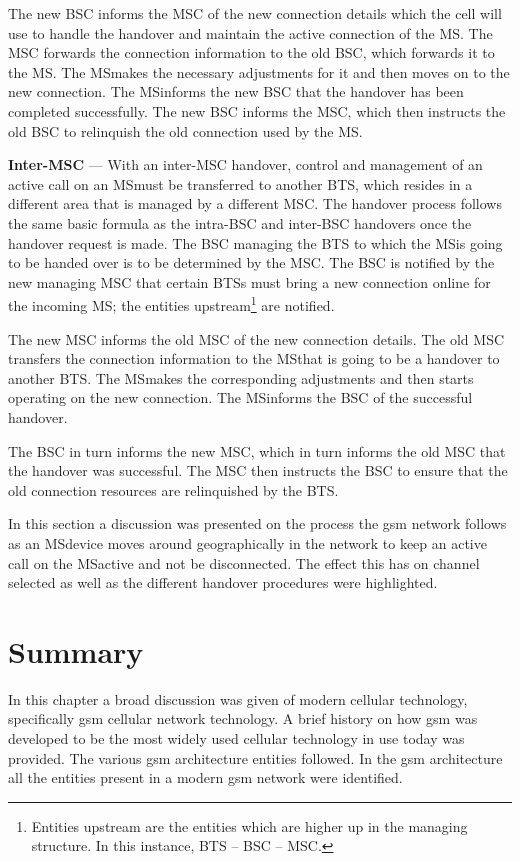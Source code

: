 \begin{description}
The new BSC informs the MSC of the new connection details which the cell will use to handle the handover and maintain the active connection of the MS\@. The MSC forwards the connection information to the old BSC, which forwards it to the MS\@. The \gls{MS}makes the necessary adjustments for it and then moves on to the new connection. The \gls{MS}informs the new BSC that the handover has been completed successfully. The new BSC informs the MSC, which then instructs the old BSC to relinquish the old connection used by the MS\cite{wirelesstelcoMullet,GSMArchitectureProtocolsServices}.
\item{\textbf{Inter-MSC}} --- With an inter-MSC handover, control and management of an active call on an \gls{MS}must be transferred to another BTS, which resides in a different area that is managed by a different MSC\@. The handover process follows the same basic formula as the intra-BSC and inter-BSC handovers once the handover request is made\cite{wirelesstelcoMullet,GSMArchitectureProtocolsServices}.
The BSC managing the BTS to which the \gls{MS}is going to be handed over is to be determined by the MSC\@. The BSC is notified by the new managing MSC that certain BTSs must bring a new connection online for the incoming MS; the entities upstream\footnote{Entities upstream are the entities which are higher up in the managing structure. In this instance, BTS -- BSC -- MSC\@.} are notified\cite{wirelesstelcoMullet,GSMArchitectureProtocolsServices}.

The new MSC informs the old MSC of the new connection details. The old MSC transfers the connection information to the \gls{MS}that is going to be a handover to another BTS\@. The \gls{MS}makes the corresponding adjustments and then starts operating on the new connection. The \gls{MS}informs the BSC of the successful handover\cite{wirelesstelcoMullet,GSMArchitectureProtocolsServices}. 

The BSC in turn informs the new MSC, which in turn informs the old MSC that the handover was successful. The MSC then instructs the BSC to ensure that the old connection resources are relinquished by the BTS.
\end{description}

In this section a discussion was presented on the process the \gls{gsm} network follows as an \gls{MS}device moves around geographically in the network to keep an active call on the \gls{MS}active and not be disconnected. The effect this has on channel selected as well as the different handover procedures were highlighted. 
\section{Summary}
In this chapter a broad discussion was given of modern cellular technology, specifically \gls{gsm} cellular network technology. A brief history on how \gls{gsm} was developed to be the most widely used cellular technology in use today was provided. The various \gls{gsm} architecture entities followed. In the \gls{gsm} architecture all the entities present in a modern \gls{gsm} network were identified.

